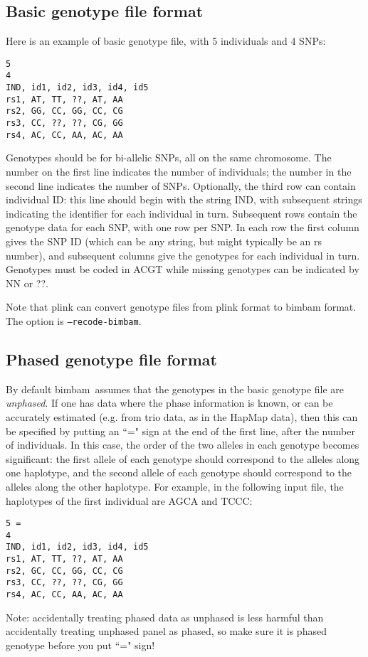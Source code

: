 \documentclass[11pt,Palatino]{article}
\def\bimbam{{\sc bimbam}~}
\begin{document}
\subsection{Basic genotype file format}
Here is an example of basic genotype file, with 5 individuals and 4 SNPs:
\begin{verbatim}
5
4
IND, id1, id2, id3, id4, id5
rs1, AT, TT, ??, AT, AA
rs2, GG, CC, GG, CC, CG
rs3, CC, ??, ??, CG, GG
rs4, AC, CC, AA, AC, AA
\end{verbatim}
Genotypes should be for bi-allelic SNPs, all on the same chromosome. 
The number on the first line indicates the number of individuals; the number in the second line indicates the number of SNPs. Optionally, the third row can contain individual ID: this line should begin with the string IND, with subsequent strings indicating the identifier for each individual in turn. 
Subsequent rows contain the genotype data for each SNP, with one row per SNP. In each row the first column gives the SNP ID (which can be any string, but might typically be an rs number), and subsequent columns give the genotypes for each individual in turn. Genotypes must be coded in ACGT while missing genotypes can be indicated by NN or ??.

Note that plink can convert genotype files from plink format to bimbam format. The option is {\tt --recode-bimbam}. 

\subsection{Phased genotype file format}
By default \bimbam assumes that the genotypes in the basic genotype file are {\it unphased}. If one has data where the phase
information is known, or can be accurately estimated (e.g. from trio data, as in the HapMap data), then this can be specified
by putting an ``=" sign at the end of the first line, after the number of individuals. In this case, the order of the two alleles in
each genotype becomes significant: the first allele of each genotype should correspond to the alleles along one haplotype, and the second allele of
each genotype should correspond to the alleles along the other haplotype. For example, in the following input file, the
haplotypes of the first individual are AGCA and TCCC:
\begin{verbatim}
5 =
4
IND, id1, id2, id3, id4, id5
rs1, AT, TT, ??, AT, AA
rs2, GC, CC, GG, CC, CG
rs3, CC, ??, ??, CG, GG
rs4, AC, CC, AA, AC, AA
\end{verbatim}
{Note:} accidentally treating phased data as unphased is less harmful than accidentally treating unphased panel as phased, so make sure it is phased genotype before you put ``=" sign!
\end{document}
